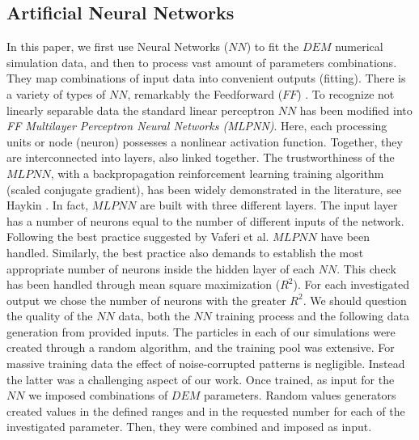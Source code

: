 \subsection{Artificial Neural Networks}
\label{subsec:ann}

In this paper, we first use Neural Networks ($NN$) to fit the $DEM$ numerical
simulation data, and then to process vast amount of parameters combinations. 
They map combinations of input data into convenient outputs (fitting). 
There is a variety of types of $NN$, remarkably the Feedforward ($FF$) . 
To recognize not linearly separable data the standard linear perceptron $NN$ 
has been modified into \textit{FF Multilayer Perceptron Neural Networks (MLPNN)}. 
Here, each processing units or node (neuron) possesses a nonlinear activation function. 
Together, they are interconnected into layers, also linked together. 
The trustworthiness of the $MLPNN$, with a backpropagation reinforcement learning 
training algorithm (scaled conjugate gradient), has been widely demonstrated in the 
literature, see Haykin \cite{RefWorks:158}. 
In fact, $MLPNN$ are built with three different layers. 
The input layer has a number of neurons equal to the number of different inputs
of the network.
Following the best practice suggested by Vaferi et al. \cite{RefWorks:150} $MLPNN$ have been handled.
Similarly, the best practice also demands to establish the most appropriate number of neurons inside the 
hidden layer of each $NN$. This check has been handled through mean square maximization ($R^2$). 
For each investigated output we chose the number of neurons with the greater
$R^2$.
We should question the quality of the $NN$ data, both the $NN$ training process and the following data
generation from provided inputs.
The particles in each of our simulations were created through a random
algorithm, and the training pool was extensive.
For massive training data the effect of noise-corrupted patterns is negligible. 
Instead the latter was a challenging aspect of our work. Once trained, as input for the $NN$ we imposed 
combinations of $DEM$ parameters. 
Random values generators created values in the defined ranges and in the requested 
number for each of the investigated parameter. Then, they were combined and imposed as input.